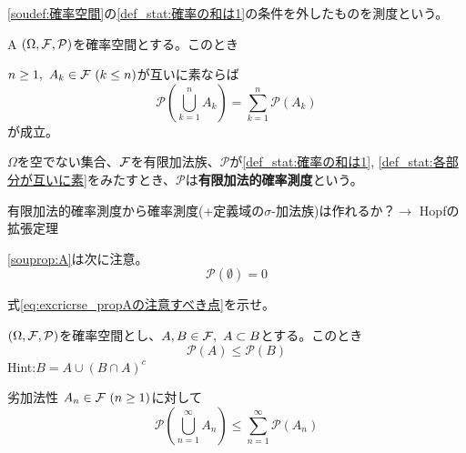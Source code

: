 \documentclass[dvipdfmx, leqno]{jsbook}
\begin{document}
\begin{souremark}
    \cref{soudef:確率空間}の\ref{def_stat:確率の和は1}の条件を外したものを測度という。
\end{souremark}

\begin{souprop}{A}\label{souprop:A}
    $(\Omega, \mathcal{F}, \mathcal{P})$を確率空間とする。このとき

    $n\ge 1,\ A_k\in \mathcal{F}\ (k\le n)$が互いに素ならば
\begin{equation*}
    \mathcal{P}\left(\bigcup_{k= 1}^n A_k\right)= \sum_{k= 1}^n \mathcal{P}(A_k)
\end{equation*}
    が成立。
\end{souprop}

\begin{souremark}
    $\Omega$を空でない集合、$\mathcal{F}$を有限加法族、$\mathcal{P}$が\ref{def_stat:確率の和は1}, \ref{def_stat:各部分が互いに素}をみたすとき、$\mathcal{P}$は\textbf{有限加法的確率測度}という。
\end{souremark}

\begin{souquiz}
    有限加法的確率測度から確率測度(+定義域の$\sigma$-加法族)は作れるか？$\to$ Hopfの拡張定理
\end{souquiz}

\begin{souremark}
    \cref{souprop:A}は次に注意。
\begin{equation}\label{eq:excricrse_propAの注意すべき点}
    \mathcal{P}(\emptyset)= 0
\end{equation}
\end{souremark}
\begin{souexcricrse}
    式\eqref{eq:excricrse_propAの注意すべき点}を示せ。
\end{souexcricrse}

\begin{soucor}
    $(\Omega, \mathcal{F}, \mathcal{P})$を確率空間とし、$A, B\in \mathcal{F},\ A\subset B$とする。このとき
\begin{equation*}
    \mathcal{P}(A)\le \mathcal{P}(B)
\end{equation*}
    Hint:$B= A\cup (B\cap A)^c$
\end{soucor}

\begin{southm}{劣加法性}
    $A_n\in \mathcal{F}\ (n\ge 1)$に対して
\begin{equation*}
    \mathcal{P}\left(\bigcup_{n= 1}^\infty A_n\right)\le \sum_{n= 1}^\infty \mathcal{P}\left(A_n\right)
\end{equation*}
\end{southm}
\end{document}
